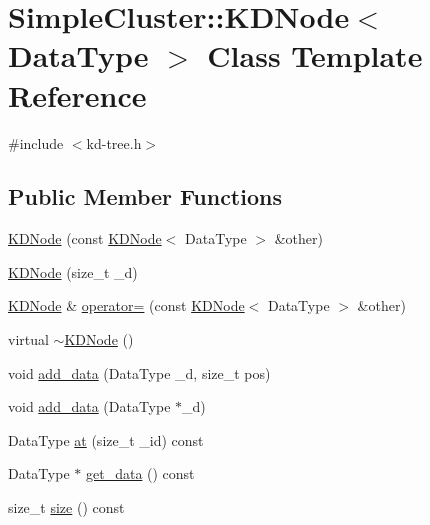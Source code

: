 \hypertarget{classSimpleCluster_1_1KDNode}{\section{Simple\-Cluster\-:\-:K\-D\-Node$<$ Data\-Type $>$ Class Template Reference}
\label{classSimpleCluster_1_1KDNode}
}


{\ttfamily \#include $<$kd-\/tree.\-h$>$}

\subsection*{Public Member Functions}
\begin{DoxyCompactItemize}
\item 
\hyperlink{classSimpleCluster_1_1KDNode_a1722141bf4dab3bb456e0a119c61f4eb}{K\-D\-Node} (const \hyperlink{classSimpleCluster_1_1KDNode}{K\-D\-Node}$<$ Data\-Type $>$ \&other)
\item 
\hyperlink{classSimpleCluster_1_1KDNode_a34f813a9d53845f25ff11f1f3fad9ea9}{K\-D\-Node} (size\-\_\-t \-\_\-d)
\item 
\hyperlink{classSimpleCluster_1_1KDNode}{K\-D\-Node} \& \hyperlink{classSimpleCluster_1_1KDNode_a7719d6922448ee1c3c4f777117ce48a0}{operator=} (const \hyperlink{classSimpleCluster_1_1KDNode}{K\-D\-Node}$<$ Data\-Type $>$ \&other)
\item 
virtual \hyperlink{classSimpleCluster_1_1KDNode_a997a7e9b6cb385f9a8978a081244f34b}{$\sim$\-K\-D\-Node} ()
\item 
void \hyperlink{classSimpleCluster_1_1KDNode_a677b5c80b8c79d90df3a154bed0f852e}{add\-\_\-data} (Data\-Type \-\_\-d, size\-\_\-t pos)
\item 
void \hyperlink{classSimpleCluster_1_1KDNode_ae298e978e3ee74d2e005cc2c444092d8}{add\-\_\-data} (Data\-Type $\ast$\-\_\-d)
\item 
Data\-Type \hyperlink{classSimpleCluster_1_1KDNode_a95bf12176f7791462ba64761261ce571}{at} (size\-\_\-t \-\_\-id) const 
\item 
Data\-Type $\ast$ \hyperlink{classSimpleCluster_1_1KDNode_a8e4425575a97ed7dafd0e54f859ceaf8}{get\-\_\-data} () const 
\item 
size\-\_\-t \hyperlink{classSimpleCluster_1_1KDNode_a8dac1174c6fc18b1403e378d5e501916}{size} () const 
\end{DoxyCompactItemize}
